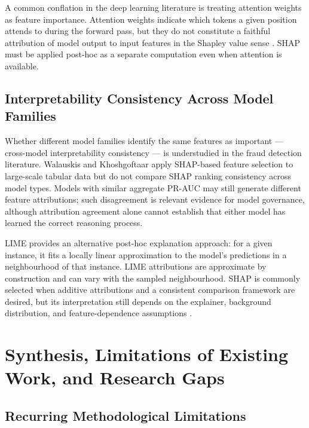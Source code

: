 A common conflation in the deep learning literature is treating attention weights as feature importance. Attention weights indicate which tokens a given position attends to during the forward pass, but they do not constitute a faithful attribution of model output to input features in the Shapley value sense \cite{molnar2022interpretable}. SHAP must be applied post-hoc as a separate computation even when attention is available.

\subsection{Interpretability Consistency Across Model Families}
\label{subsec:sota-xai-cross-model}

Whether different model families identify the same features as important — cross-model interpretability consistency — is understudied in the fraud detection literature. Walauskis and Khoshgoftaar \cite{walauskis2024scalable} apply SHAP-based feature selection to large-scale tabular data but do not compare SHAP ranking consistency across model types. Models with similar aggregate PR-AUC may still generate different feature attributions; such disagreement is relevant evidence for model governance, although attribution agreement alone cannot establish that either model has learned the correct reasoning process.

LIME \cite{ribeiro2016lime} provides an alternative post-hoc explanation approach: for a given instance, it fits a locally linear approximation to the model's predictions in a neighbourhood of that instance. LIME attributions are approximate by construction and can vary with the sampled neighbourhood. SHAP is commonly selected when additive attributions and a consistent comparison framework are desired, but its interpretation still depends on the explainer, background distribution, and feature-dependence assumptions \cite{molnar2022interpretable}.

\section{Synthesis, Limitations of Existing Work, and Research Gaps}
\label{subsec:limitations_research}

\subsection{Recurring Methodological Limitations}
\label{subsec:sota-limitations}

